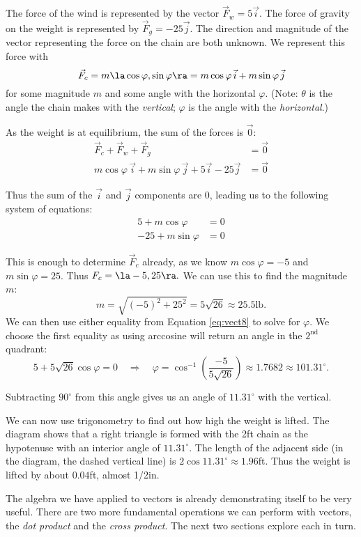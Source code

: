 {The force of the wind is represented by the vector $\vec F_w = 5\vec i$. The force of gravity on the weight is represented by $\vec F_g = -25\vec j$. The direction and magnitude of the vector representing the force on the chain are both unknown. We represent this force with $$\vec F_c = m\la \cos\varphi,\sin\varphi\ra = m\cos\varphi\, \vec i + m\sin\varphi\,\vec j$$ for some magnitude $m$ and some angle with the horizontal $\varphi$. (Note: $\theta$ is the angle the chain makes with the \emph{vertical}; $\varphi$ is the angle with the \emph{horizontal}.)

As the weight is at equilibrium, the sum of the forces is $\vec0$:
\begin{align*}
\vec F_c + \vec F_w + \vec F_g &= \vec 0\\
m\cos\varphi\, \vec i + m\sin\varphi\,\vec j + 5\vec i - 25\vec j &=\vec 0
\end{align*}

 Thus the sum of the $\vec i$ and $\vec j$ components are 0, leading us to the following system of equations:
\begin{equation}
\begin{split}
5+m\cos\varphi &= 0\\
-25+m\sin\varphi &= 0
\end{split}\label{eq:vect8}
\end{equation}

This is enough to determine $\vec F_c$ already, as we know $m\cos \varphi = -5$ and $m\sin\varphi =25$. Thus $F_c = \la -5,25\ra.$ We can use this to find the magnitude $m$:
$$m = \sqrt{(-5)^2+25^2} = 5\sqrt{26}\approx 25.5\text{lb}.$$
We can then use either equality from Equation \eqref{eq:vect8} to solve for $\varphi$. We choose the first equality as using arccosine will return an angle in the $2^\text{nd}$ quadrant:
$$5 + 5\sqrt{26}\cos \varphi = 0 \quad \Rightarrow \quad \varphi = \cos^{-1}\left(\frac{-5}{5\sqrt{26}}\right) \approx 1.7682\approx 101.31^\circ.$$

Subtracting $90^\circ$ from this angle gives us an angle of $11.31^\circ$ with the vertical.

We can now use trigonometry to find out how high the weight is lifted. The diagram shows that a right triangle is formed with the 2ft chain as the hypotenuse with an interior angle of $11.31^\circ$. The length of the adjacent side (in the diagram, the dashed vertical line) is $2\cos 11.31^\circ \approx 1.96$ft. Thus the weight is lifted by about $0.04$ft, almost 1/2in.}

The algebra we have applied to vectors is already demonstrating itself to be very useful. There are two more fundamental operations we can perform with vectors, the \emph{dot product} and the \emph{cross product}. The next two sections explore each in turn.

